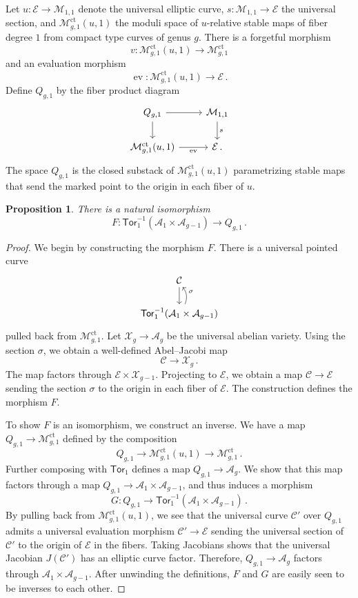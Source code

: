 \documentclass[11pt]{amsart}
\newtheorem{prop}[thm]{Proposition}
\theoremstyle{definition}
\newcommand{\X}{\mathcal{X}}
\newcommand{\C}{\mathcal{C}}
\newcommand{\M}{\mathcal{M}}
\newcommand{\A}{\mathcal{A}}
\newcommand{\E}{\mathcal{E}}
\DeclareMathOperator{\ct}{ct}
\DeclareMathOperator{\ev}{ev}
\newcommand{\Tor}{\mathsf{Tor}}
\begin{document}
{Let $u:\E\rightarrow \M_{1,1}$ denote the universal elliptic curve, $s:\M_{1,1}\rightarrow \E$ the universal section, and $\M_{g,1}^{\ct}(u,1)$ the moduli space of $u$-relative stable maps of fiber degree $1$ from compact type curves of genus $g$. There is a forgetful morphism
\[
v:\M_{g,1}^{\ct}(u,1)\rightarrow \M_{g,1}^{\ct}
\]
and an evaluation morphism
\[
\ev:\M_{g,1}^{\ct}(u,1)\rightarrow \E\,.
\]
Define $Q_{g,1}$ by the fiber product diagram
\begin{equation}\label{Qg1}
\begin{tikzcd}
{Q_{g,1}} \arrow[d] \arrow[r]            & {\M_{1,1}} \arrow[d, "s"] \\
{\M_{g,1}^{\ct}(u,1)} \arrow[r, "\ev"'] & \E   \,.                    
\end{tikzcd}
\end{equation}
The space $Q_{g,1}$ is the closed substack of $\M_{g,1}^{\ct}(u,1)$ parametrizing stable maps that send the marked point to the origin in each fiber of $u$.
\begin{prop} \label{natisom}
There is a natural isomorphism
\[
F:\Tor_1^{-1}(\A_1\times \A_{g-1})\rightarrow Q_{g,1}\, .
\]
\end{prop}
\begin{proof}
    We begin by constructing the morphism $F$. There is a universal pointed curve 
    \[
    \begin{tikzcd}
\C \arrow[d]                                                      \\
\Tor_1^{-1}(\A_1\times \A_{g-1}) \arrow[u, "\sigma"', bend right]
\end{tikzcd}
    \]
pulled back from $\M_{g,1}^{\ct}$. Let $\X_g\rightarrow \A_g$ be the universal abelian variety. Using the section $\sigma$, we obtain a well-defined Abel--Jacobi map
\[
\C\rightarrow \X_g\,.
\]
The map factors through $\E\times \X_{g-1}$. Projecting to $\E$, we obtain a map $\C\rightarrow \E$ sending the section $\sigma$ to the origin in each fiber of $\E$. The construction defines the morphism $F$.

To show $F$ is an isomorphism, we construct an inverse. We have a map $Q_{g,1}\rightarrow \M_{g,1}^{\ct}$ defined by the composition $$Q_{g,1}\rightarrow \M_{g,1}^{\ct}(u,1)\rightarrow \M_{g,1}^{\ct}\, .$$ Further composing with $\Tor_{1}$ defines a map $Q_{g,1}\rightarrow \A_g$. We show that this map factors through a map $Q_{g,1}\rightarrow \A_1\times \A_{g-1}$, and thus induces a morphism $$G:Q_{g,1}\rightarrow \Tor_1^{-1}(\A_1\times \A_{g-1})\, .$$ By pulling back from $\M_{g,1}^{\ct}(u,1)$, we see that the universal curve $\C'$ over $Q_{g,1}$ admits a universal evaluation morphism $\C'\rightarrow \E$ sending the universal section of $\C'$ to the origin of $\E$ in the fibers. Taking Jacobians shows that the universal Jacobian $J(\C')$ has an elliptic curve factor. Therefore, $Q_{g,1}\rightarrow \A_g$ factors through $\A_1\times \A_{g-1}$. 
After unwinding the definitions, $F$ and $G$ are easily seen to be inverses to each other.
\end{proof}

}
\end{document}
